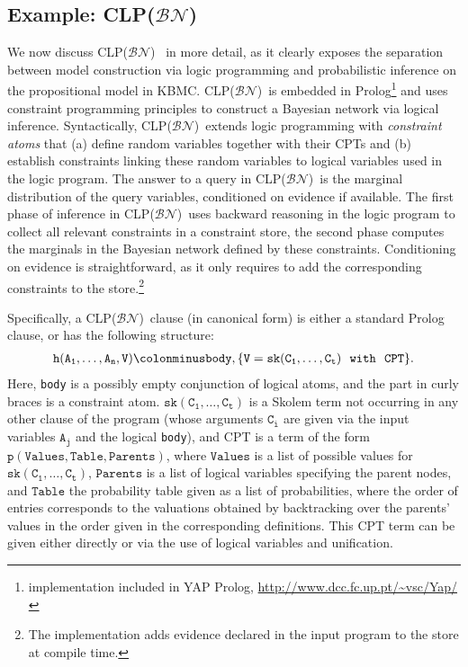 \documentclass[a4paper]{article}
\newcommand{\clpbn}
  {CLP($\mathcal{BN}$)}
\begin{document}
\subsection{Example: \clpbn}
\label{sec:cplbbn}
We now discuss \clpbn~\citep{clpbn} in more detail, as it
clearly exposes the separation between model
construction via logic programming and probabilistic inference on the
propositional model in KBMC. \clpbn\ is embedded in
Prolog\footnote{implementation included in YAP Prolog,
  \url{http://www.dcc.fc.up.pt/~vsc/Yap/}} and uses constraint
programming principles to construct a Bayesian network via
logical inference. Syntactically, \clpbn\ extends logic programming
with \emph{constraint atoms} that (a) define random variables together
with their CPTs and (b) establish constraints linking these random
variables to logical variables used in the logic program. The answer
to a query in \clpbn\ is the marginal distribution of the query
variables, conditioned on evidence if available. 
The first
phase of inference in
\clpbn\ uses backward reasoning in the logic program to collect
all relevant constraints in a constraint store, the second phase computes the marginals in the
Bayesian network defined by these constraints. Conditioning on
evidence is straightforward, as it only requires to add the
corresponding constraints to the store.\footnote{The implementation
  adds evidence declared in the input program to the store at compile time.}

Specifically, a \clpbn\ clause (in canonical form) is either a
standard Prolog clause, or has the following
structure:
\begin{align*}
\mathtt{h(A_1,\ldots,A_n,V)} \colonminus \mathtt{body, \{ V = sk(C_1,\ldots,C_t)~~ with ~~CPT \}.}
\end{align*}
Here, \verb|body| is a possibly empty conjunction of logical atoms,
and the part in curly braces is a constraint atom. 
$\mathtt{sk(C_1,\ldots,C_t)}$ is a Skolem term  not occurring in any other clause of
the program (whose arguments $\mathtt{C_i}$ are given via the input
variables $\mathtt{A_j}$ and the logical \verb|body|), and CPT is a
term of the form $\mathtt{p(Values, Table , Parents )}$, where $\mathtt{Values}$ is a list of possible
values for $\mathtt{sk(C_1,\ldots,C_t)}$, $\mathtt{Parents}$ is a
list of logical variables specifying the parent nodes, and $\mathtt{Table}$ the probability table given as  a list of probabilities, where the order
of entries corresponds to the valuations obtained by backtracking over
the parents' values in the order given in the corresponding
definitions. This CPT term can be given either directly or via the use of
logical variables and unification. 
\end{document}
